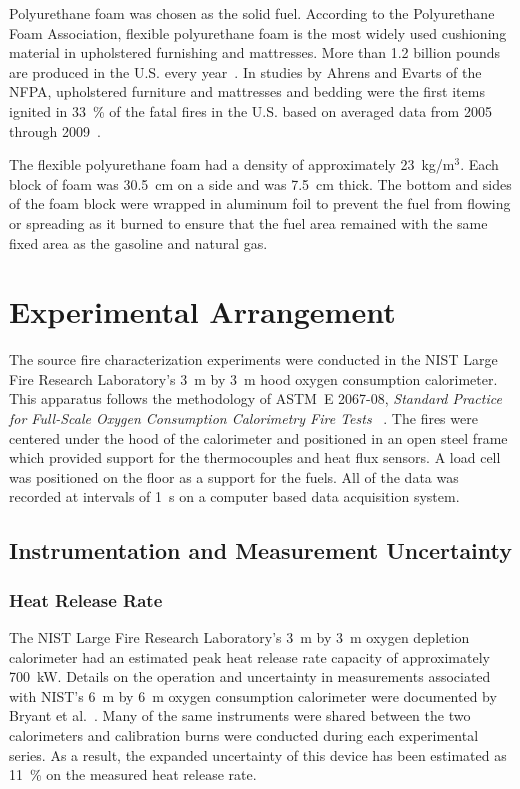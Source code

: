 \documentclass[twoside]{uocthesis}
\begin{document}
{Polyurethane foam was chosen as the solid fuel. According to the Polyurethane Foam Association, flexible polyurethane foam is the most widely used cushioning material in upholstered furnishing and mattresses. More than 1.2 billion pounds are produced in the U.S. every year~\cite{Foam,Polyurethane_Foam}. In studies by Ahrens and Evarts of the NFPA, upholstered furniture and mattresses and bedding were the first items ignited in 33~\% of the fatal fires in the U.S. based on averaged data from 2005 through 2009~\cite{Ahrens:2011,Evarts:2011}.

The flexible polyurethane foam had a density of approximately 23~kg/m$^3$.  Each block of foam was 30.5~cm on a side and was 7.5~cm thick. The bottom and sides of the foam block were wrapped in aluminum foil to prevent the fuel from flowing or spreading as it burned to ensure that the fuel area remained with the same fixed area as the gasoline and natural gas.

\section{Experimental Arrangement}

The source fire characterization experiments were conducted in the NIST Large Fire Research Laboratory's 3~m by 3~m hood oxygen consumption calorimeter. This apparatus follows the methodology of ASTM~E 2067-08, {\em Standard Practice for Full-Scale Oxygen Consumption Calorimetry Fire Tests} ~\cite{ASTM_E2067}. The fires were centered under the hood of the calorimeter and positioned in an open steel frame which provided support for the thermocouples and heat flux sensors. A load cell was positioned on the floor as a support for the fuels.  All of the data was recorded at intervals of 1~s on a computer based data acquisition system.

\subsection{Instrumentation and Measurement Uncertainty}

\subsubsection{Heat Release Rate}

The NIST Large Fire Research Laboratory's 3~m by 3~m oxygen depletion calorimeter had an estimated peak heat release rate capacity of approximately 700~kW.  Details on the operation and uncertainty in measurements associated with NIST’s 6~m by 6~m oxygen consumption calorimeter were documented by Bryant et al.~\cite{Bryant:2004}. Many of the same instruments were shared between the two calorimeters and calibration burns were conducted during each experimental series.  As a result, the expanded uncertainty of this device has been estimated as 11~\% on the measured heat release rate.

}
\end{document}
